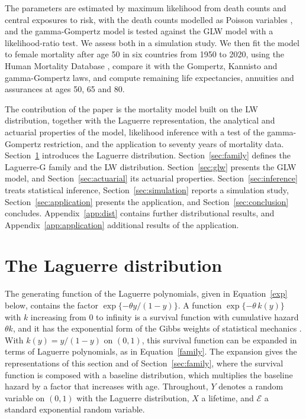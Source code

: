 \documentclass[12pt]{article}
\newcommand{\Exp}{\mathcal{E}}   %
\begin{document}
The parameters are estimated by maximum likelihood from death counts and central exposures to risk, with the death counts modelled as Poisson variables \citep{brillinger1986biometrics, macdonald2018modelling}, and the gamma-Gompertz model is tested against the GLW model with a likelihood-ratio test. We assess both in a simulation study. We then fit the model to female mortality after age 50 in six countries from 1950 to 2020, using the Human Mortality Database \citep{hmd}, compare it with the Gompertz, Kannisto and gamma-Gompertz laws, and compute remaining life expectancies, annuities and assurances at ages 50, 65 and 80.

The contribution of the paper is the mortality model built on the LW distribution, together with the Laguerre representation, the analytical and actuarial properties of the model, likelihood inference with a test of the gamma-Gompertz restriction, and the application to seventy years of mortality data. Section~\ref{sec:laguerre} introduces the Laguerre distribution. Section~\ref{sec:family} defines the Laguerre-G family and the LW distribution. Section~\ref{sec:glw} presents the GLW model, and Section~\ref{sec:actuarial} its actuarial properties. Section~\ref{sec:inference} treats statistical inference, Section~\ref{sec:simulation} reports a simulation study, Section~\ref{sec:application} presents the application, and Section~\ref{sec:conclusion} concludes. Appendix~\ref{app:dist} contains further distributional results, and Appendix~\ref{app:application} additional results of the application.


\section{The Laguerre distribution}\label{sec:laguerre}

The generating function of the Laguerre polynomials, given in Equation~\eqref{exp} below, contains the factor $\exp\{-\theta y/(1-y)\}$. A function $\exp\{-\theta\,k(y)\}$ with $k$ increasing from 0 to infinity is a survival function with cumulative hazard $\theta k$, and it has the exponential form of the Gibbs weights of statistical mechanics \citep[see][]{georgii2011gibbs}. With $k(y)=y/(1-y)$ on $(0,1)$, this survival function can be expanded in terms of Laguerre polynomials, as in Equation~\eqref{family}. The expansion gives the representations of this section and of Section~\ref{sec:family}, where the survival function is composed with a baseline distribution, which multiplies the baseline hazard by a factor that increases with age. Throughout, $Y$ denotes a random variable on $(0,1)$ with the Laguerre distribution, $X$ a lifetime, and $\Exp$ a standard exponential random variable.
\end{document}
